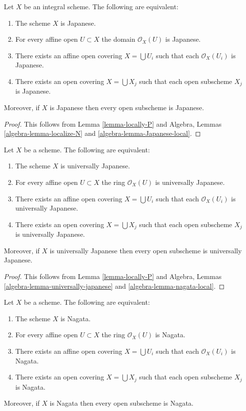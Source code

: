 \begin{lemma}
\label{lemma-locally-Japanese}
Let $X$ be an integral scheme. The following are equivalent:
\begin{enumerate}
\item The scheme $X$ is Japanese.
\item For every affine open $U \subset X$ the domain $\mathcal{O}_X(U)$
is Japanese.
\item There exists an affine open covering $X = \bigcup U_i$
such that each $\mathcal{O}_X(U_i)$ is Japanese.
\item There exists an open covering $X = \bigcup X_j$
such that each open subscheme $X_j$ is Japanese.
\end{enumerate}
Moreover, if $X$ is Japanese then every open subscheme
is Japanese.
\end{lemma}

\begin{proof}
This follows from Lemma \ref{lemma-locally-P} and
Algebra, Lemmas \ref{algebra-lemma-localize-N} and
\ref{algebra-lemma-Japanese-local}.
\end{proof}

\begin{lemma}
\label{lemma-locally-universally-Japanese}
Let $X$ be a scheme. The following are equivalent:
\begin{enumerate}
\item The scheme $X$ is universally Japanese.
\item For every affine open $U \subset X$ the ring $\mathcal{O}_X(U)$
is universally Japanese.
\item There exists an affine open covering $X = \bigcup U_i$
such that each $\mathcal{O}_X(U_i)$ is universally Japanese.
\item There exists an open covering $X = \bigcup X_j$
such that each open subscheme $X_j$ is universally Japanese.
\end{enumerate}
Moreover, if $X$ is universally Japanese then every open subscheme
is universally Japanese.
\end{lemma}

\begin{proof}
This follows from Lemma \ref{lemma-locally-P} and
Algebra, Lemmas \ref{algebra-lemma-universally-japanese} and
\ref{algebra-lemma-nagata-local}.
\end{proof}

\begin{lemma}
\label{lemma-locally-nagata}
Let $X$ be a scheme. The following are equivalent:
\begin{enumerate}
\item The scheme $X$ is Nagata.
\item For every affine open $U \subset X$ the ring $\mathcal{O}_X(U)$
is Nagata.
\item There exists an affine open covering $X = \bigcup U_i$
such that each $\mathcal{O}_X(U_i)$ is Nagata.
\item There exists an open covering $X = \bigcup X_j$
such that each open subscheme $X_j$ is Nagata.
\end{enumerate}
Moreover, if $X$ is Nagata then every open subscheme is Nagata.
\end{lemma}

